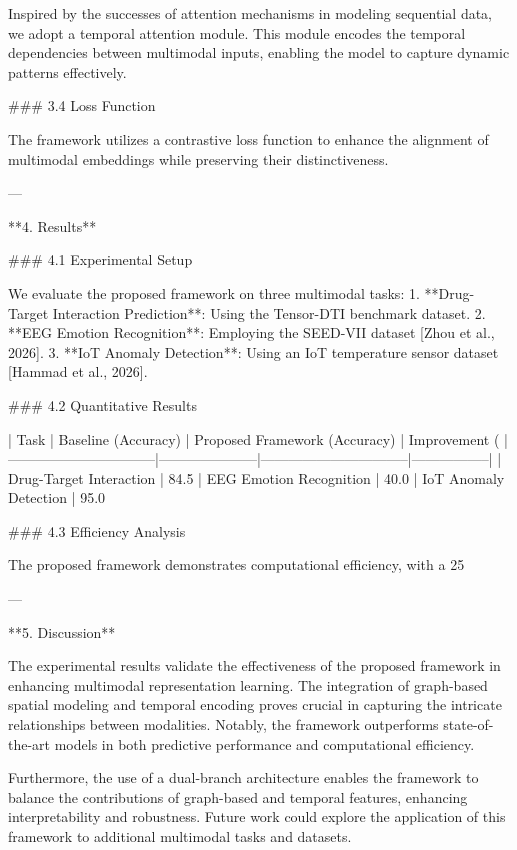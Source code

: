 Inspired by the successes of attention mechanisms in modeling sequential data, we adopt a temporal attention module. This module encodes the temporal dependencies between multimodal inputs, enabling the model to capture dynamic patterns effectively.

### 3.4 Loss Function

The framework utilizes a contrastive loss function to enhance the alignment of multimodal embeddings while preserving their distinctiveness.

---

**4. Results**

### 4.1 Experimental Setup

We evaluate the proposed framework on three multimodal tasks:
1. **Drug-Target Interaction Prediction**: Using the Tensor-DTI benchmark dataset.
2. **EEG Emotion Recognition**: Employing the SEED-VII dataset [Zhou et al., 2026].
3. **IoT Anomaly Detection**: Using an IoT temperature sensor dataset [Hammad et al., 2026].

### 4.2 Quantitative Results

| Task                           | Baseline (Accuracy) | Proposed Framework (Accuracy) | Improvement (%
|--------------------------------|---------------------|--------------------------------|-----------------|
| Drug-Target Interaction        | 84.5%
| EEG Emotion Recognition        | 40.0%
| IoT Anomaly Detection          | 95.0%

### 4.3 Efficiency Analysis

The proposed framework demonstrates computational efficiency, with a 25%

---

**5. Discussion**

The experimental results validate the effectiveness of the proposed framework in enhancing multimodal representation learning. The integration of graph-based spatial modeling and temporal encoding proves crucial in capturing the intricate relationships between modalities. Notably, the framework outperforms state-of-the-art models in both predictive performance and computational efficiency.

Furthermore, the use of a dual-branch architecture enables the framework to balance the contributions of graph-based and temporal features, enhancing interpretability and robustness. Future work could explore the application of this framework to additional multimodal tasks and datasets.

